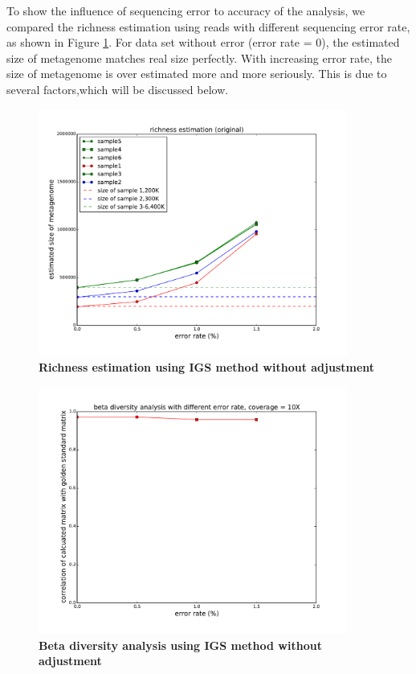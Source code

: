 To show the influence of sequencing error to accuracy of the 
analysis, we compared the richness estimation using reads with different 
sequencing error rate, as shown in Figure \ref{fig:IGS_richness_no_adjustment}. 
For data set without error (error rate = 0), the estimated size of metagenome
matches real size perfectly. With increasing error rate, the size of metagenome
is over estimated more and more seriously. This is due to several factors,which
will be discussed below. 
\begin{figure}[!ht]
 \centerline{\includegraphics[width=4in]{./figures/alpha_by_error_no_adjust.pdf}}
\caption{\bf Richness estimation using IGS method without adjustment}
\label{fig:IGS_richness_no_adjustment}
\end{figure}

\begin{figure}[!ht]
 \centerline{\includegraphics[width=4in]{./figures/beta_by_error.pdf}}
\caption{\bf Beta diversity analysis using IGS method without adjustment}
\label{fig:beta_no_adjustment}
\end{figure}

